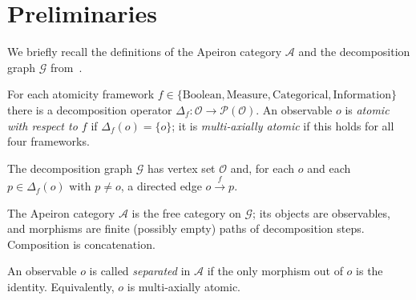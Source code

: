 \section{Preliminaries}
We briefly recall the definitions of the Apeiron category \(\mathcal{A}\) and the decomposition graph \(\mathcal{G}\) from~\cite{Beniers2026Categorical}.

\begin{definition}
For each atomicity framework \(f \in \{\text{Boolean},\text{Measure},\text{Categorical},\text{Information}\}\) there is a decomposition operator \(\Delta_f : \mathcal{O} \to \mathcal{P}(\mathcal{O})\).
An observable \(o\) is \emph{atomic with respect to \(f\)} if \(\Delta_f(o) = \{o\}\); it is \emph{multi‑axially atomic} if this holds for all four frameworks.
\end{definition}

\begin{definition}
The decomposition graph \(\mathcal{G}\) has vertex set \(\mathcal{O}\) and, for each \(o\) and each \(p \in \Delta_f(o)\) with \(p \neq o\), a directed edge \(o \xrightarrow{f} p\).
\end{definition}

\begin{definition}
The Apeiron category \(\mathcal{A}\) is the free category on \(\mathcal{G}\); its objects are observables, and morphisms are finite (possibly empty) paths of decomposition steps.
Composition is concatenation.
\end{definition}

An observable \(o\) is called \emph{separated} in \(\mathcal{A}\) if the only morphism out of \(o\) is the identity.
Equivalently, \(o\) is multi‑axially atomic.